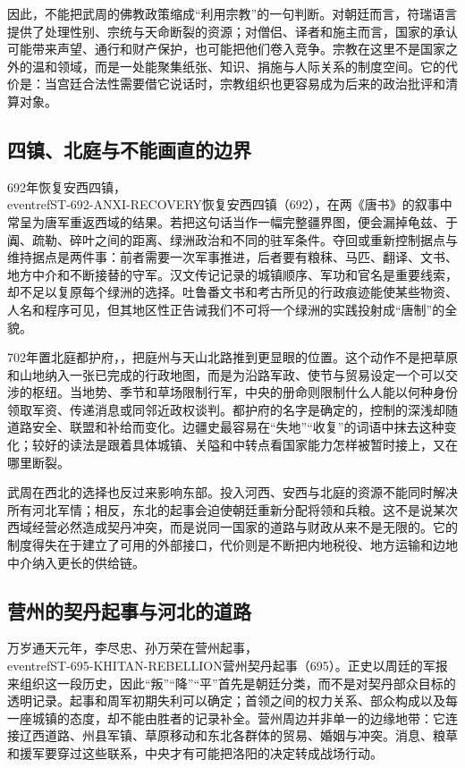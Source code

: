 因此，不能把武周的佛教政策缩成“利用宗教”的一句判断。对朝廷而言，符瑞语言提供了处理性别、宗统与天命断裂的资源；对僧侣、译者和施主而言，国家的承认可能带来声望、通行和财产保护，也可能把他们卷入竞争。宗教在这里不是国家之外的温和领域，而是一处能聚集纸张、知识、捐施与人际关系的制度空间。它的代价是：当宫廷合法性需要借它说话时，宗教组织也更容易成为后来的政治批评和清算对象。

\subsection{四镇、北庭与不能画直的边界}
692年恢复安西四镇，\\eventref{ST-692-ANXI-RECOVERY}{恢复安西四镇（692）}，在两《唐书》的叙事中常呈为唐军重返西域的结果。若把这句话当作一幅完整疆界图，便会漏掉龟兹、于阗、疏勒、碎叶之间的距离、绿洲政治和不同的驻军条件。夺回或重新控制据点与维持据点是两件事：前者需要一次军事推进，后者要有粮秣、马匹、翻译、文书、地方中介和不断接替的守军。汉文传记记录的城镇顺序、军功和官名是重要线索，却不足以复原每个绿洲的选择。吐鲁番文书和考古所见的行政痕迹能使某些物资、人名和程序可见，但其地区性正告诫我们不可将一个绿洲的实践投射成“唐制”的全貌。

702年置北庭都护府，，把庭州与天山北路推到更显眼的位置。这个动作不是把草原和山地纳入一张已完成的行政地图，而是为沿路军政、使节与贸易设定一个可以交涉的枢纽。当地势、季节和草场限制行军，中央的册命则限制什么人能以何种身份领取军资、传递消息或同邻近政权谈判。都护府的名字是确定的，控制的深浅却随道路安全、联盟和补给而变化。边疆史最容易在“失地”“收复”的词语中抹去这种变化；较好的读法是跟着具体城镇、关隘和中转点看国家能力怎样被暂时接上，又在哪里断裂。

武周在西北的选择也反过来影响东部。投入河西、安西与北庭的资源不能同时解决所有河北军情；相反，东北的起事会迫使朝廷重新分配将领和兵粮。这不是说某次西域经营必然造成契丹冲突，而是说同一国家的道路与财政从来不是无限的。它的制度得失在于建立了可用的外部接口，代价则是不断把内地税役、地方运输和边地中介纳入更长的供给链。

\subsection{营州的契丹起事与河北的道路}
万岁通天元年，李尽忠、孙万荣在营州起事，\\eventref{ST-695-KHITAN-REBELLION}{营州契丹起事（695）}。正史以周廷的军报来组织这一段历史，因此“叛”“降”“平”首先是朝廷分类，而不是对契丹部众目标的透明记录。起事和周军初期失利可以确定；首领之间的权力关系、部众构成以及每一座城镇的态度，却不能由胜者的记录补全。营州周边并非单一的边缘地带：它连接辽西道路、州县军镇、草原移动和东北各群体的贸易、婚姻与冲突。消息、粮草和援军要穿过这些联系，中央才有可能把洛阳的决定转成战场行动。

